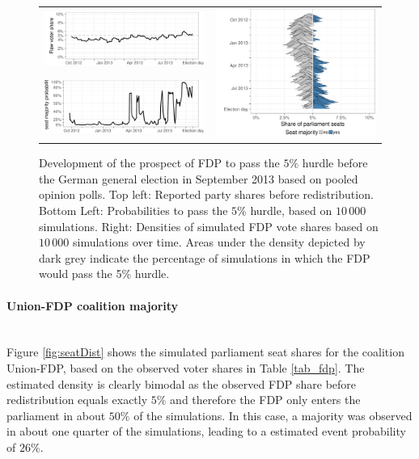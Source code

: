\documentclass[smallcondensed]{svjour3}     %
\begin{document}
\begin{figure}[H]\centering
\begin{tabular}{ll}
\includegraphics[height=.15\textwidth]{figures/2013_pooled_fdp_rawShares.pdf}
&
\multirow{2}{*}[13ex]{\includegraphics[height=30ex]{figures/2013_pooled_fdp_ridgeline.pdf}}
\\
\includegraphics[height=.15\textwidth]{figures/2013_pooled_fdp_passingProb.pdf}
\end{tabular}
\caption{Development of the prospect of FDP to pass the $5\%$ hurdle before the
German general election in September 2013 based on pooled opinion polls.
Top left: Reported party shares before redistribution. Bottom Left: Probabilities
to pass the $5\%$ hurdle, based on $10\,000$ simulations. Right: Densities of
simulated FDP vote shares based on $10\,000$ simulations over time. Areas under
the density depicted by dark grey indicate the percentage of simulations in which
the FDP would pass the 5\% hurdle.
\label{fig:2013_fdp}
}
\end{figure}


\paragraph{Union-FDP coalition majority} \ \\

Figure \ref{fig:seatDist} shows the simulated
parliament seat shares for the coalition Union-FDP, based on the observed
voter shares in Table \ref{tab_fdp}. The estimated density is clearly bimodal
as the observed FDP share before redistribution equals exactly $5\%$ and
therefore the FDP only enters the parliament in about $50\%$ of the simulations.
In this case, a majority was observed in about one quarter of the simulations,
leading to a estimated event probability of $26\%$.
\end{document}
